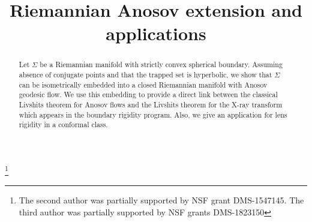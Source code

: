 \documentclass[JEP,XML,SOM,Unicode,NoFloatCountersInSection]{cedram}
\theoremstyle{definition}
\renewcommand{\>}{{\rangle}}
\newcommand{\<}{{\langle}}
\begin{document}
\frontmatter
\title{Riemannian Anosov extension and applications}

\author[\initial{D.} \lastname{Chen}]{ }
\address{Department of Mathematics, The Ohio State University\\
100 Math Tower, 231 W 18th Ave, Columbus, OH 43210, USA}
\urladdr{}

\author[\initial{A.} \lastname{Erchenko}]{ }
\address{Department of Mathematics, The University of Chicago\\
Eckhart Hall, 5734 S University Ave, Chicago, IL 60637, USA}
\urladdr{}

\author[\initial{A.} \lastname{Gogolev}]{ }
\address{Department of Mathematics, The Ohio State University\\
100 Math Tower, 231 W 18th Ave, Columbus, OH 43210, USA}
\urladdr{}

\thanks{The second author was partially supported by NSF grant DMS-1547145. The third author was partially supported by NSF grants DMS-1823150}

\begin{abstract}
Let $\Sigma$ be a Riemannian manifold with strictly convex spherical boundary. Assuming absence of conjugate points and that the trapped set is hyperbolic, we show that $\Sigma$ can be isometrically embedded into a closed Riemannian manifold with Anosov geodesic flow. We use this embedding to provide a direct link between the classical Livshits theorem for Anosov flows and the Livshits theorem for the X-ray transform which appears in the boundary rigidity program. Also, we give an application for lens rigidity in a conformal class.
\end{abstract}




\end{document}
